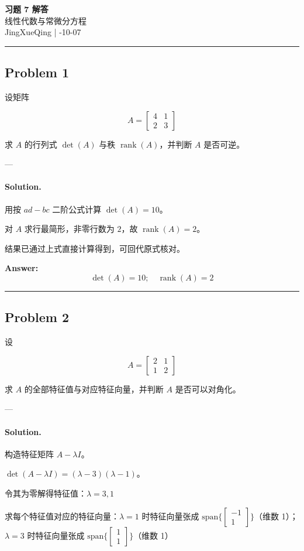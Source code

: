 \documentclass[12pt, a4paper]{article}
\newcommand{\problem}[1]{\subsection*{Problem #1}}
\newcommand{\solution}{\paragraph{Solution.}}
\begin{document}
\begin{center}
    {\LARGE\bfseries 习题 7 解答} \\[0.5em]
    {\large 线性代数与常微分方程} \\[0.3em]
    JingXueQing \quad | -10-07
\end{center}

\hrule
\vspace{1em}
\problem{1}

设矩阵

$$A = \begin{bmatrix} 4 & 1 \\ 2 & 3 \end{bmatrix}$$

求 $A$ 的行列式 $\det(A)$ 与秩 $\operatorname{rank}(A)$，并判断 $A$ 是否可逆。

---

\solution

用按 $ad-bc$ 二阶公式计算 $\det(A) = 10$。

对 $A$ 求行最简形，非零行数为 $2$，故 $\operatorname{rank}(A) = 2$。

结果已通过上式直接计算得到，可回代原式核对。

\textbf{Answer:}
\[\boxed{\det(A) = 10;\quad \operatorname{rank}(A) = 2}\]

\vspace{1em}
\hrule
\vspace{1em}

\problem{2}

设

$$A = \begin{bmatrix} 2 & 1 \\ 1 & 2 \end{bmatrix}$$

求 $A$ 的全部特征值与对应特征向量，并判断 $A$ 是否可以对角化。

---

\solution

构造特征矩阵 $A - \lambda I$。

$\det(A - \lambda I) = \left(\lambda - 3\right) \left(\lambda - 1\right)$。

令其为零解得特征值：$\lambda = 3, 1$

求每个特征值对应的特征向量：$\lambda=1$ 时特征向量张成 $\mathrm{span}\{\left[\begin{matrix}-1\\1\end{matrix}\right]\}$（维数 1）；$\lambda=3$ 时特征向量张成 $\mathrm{span}\{\left[\begin{matrix}1\\1\end{matrix}\right]\}$（维数 1）
\end{document}
